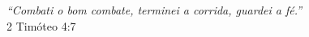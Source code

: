 \documentclass[12pt]{pastald}
\begin{document}


\maketitle 



\vspace*{\fill}
\thispagestyle{empty}
\section*{}
\vspace{2cm}


\vspace*{\fill}



\newpage
\vspace*{\fill}
\thispagestyle{empty}
\section*{}
\vspace{2cm}


\vspace*{\fill}


\newpage
\thispagestyle{empty}
\vspace*{\fill}
\begin{flushright}
\begin{minipage}{12cm}
\begin{flushright}

{\itshape
``Combati o bom combate, terminei a corrida, guardei a fé.''
}
\\ 2 Timóteo 4:7

\end{flushright}
\end{minipage}
\end{flushright}
\vspace{5cm}
\end{document}
